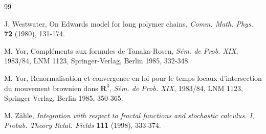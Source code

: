 \begin{thebibliography}{99}








  J. Westwater, On Edwards model for long polymer chains, 
\textit{Comm. Math. Phys.} \textbf{72} (1980), 131-174.

  M. Yor, Compl\'{e}ments aux formules de Tanaka-Rosen, \textit{%
S\'{e}m. de Prob. XIX}, 1983/84, LNM 1123, Springer-Verlag, Berlin 1985,
332-348.

  M. Yor, Renormalisation et convergence en loi pour le temps
locaux d'intersection du mouvement brownien dans $\mathbf{R}^{3}$, \textit{
S\'{e}m. de Prob. XIX}, 1983/84, LNM 1123, Springer-Verlag, Berlin 1985,
350-365.

 M. Z\"ahle, \textit{Integration with respect to fractal functions
  and stochastic calculus. I}, \textit{Probab. Theory Relat. Fields}
  \textbf{111} (1998), 333-374.

\end{thebibliography}



